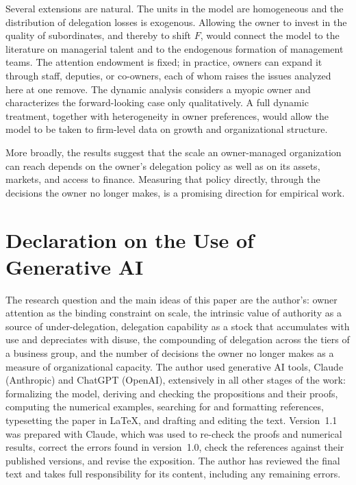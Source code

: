\documentclass[11pt,a4paper]{article}
\theoremstyle{plain}
\begin{document}
Several extensions are natural. The units in the model are homogeneous and the distribution of delegation losses is exogenous. Allowing the owner to invest in the quality of subordinates, and thereby to shift $F$, would connect the model to the literature on managerial talent and to the endogenous formation of management teams. The attention endowment is fixed; in practice, owners can expand it through staff, deputies, or co-owners, each of whom raises the issues analyzed here at one remove. The dynamic analysis considers a myopic owner and characterizes the forward-looking case only qualitatively. A full dynamic treatment, together with heterogeneity in owner preferences, would allow the model to be taken to firm-level data on growth and organizational structure.

More broadly, the results suggest that the scale an owner-managed organization can reach depends on the owner's delegation policy as well as on its assets, markets, and access to finance. Measuring that policy directly, through the decisions the owner no longer makes, is a promising direction for empirical work.

\section*{Declaration on the Use of Generative AI}\label{sec:ai}

The research question and the main ideas of this paper are the author's: owner attention as the binding constraint on scale, the intrinsic value of authority as a source of under-delegation, delegation capability as a stock that accumulates with use and depreciates with disuse, the compounding of delegation across the tiers of a business group, and the number of decisions the owner no longer makes as a measure of organizational capacity. The author used generative AI tools, Claude (Anthropic) and ChatGPT (OpenAI), extensively in all other stages of the work: formalizing the model, deriving and checking the propositions and their proofs, computing the numerical examples, searching for and formatting references, typesetting the paper in \LaTeX, and drafting and editing the text. Version~1.1 was prepared with Claude, which was used to re-check the proofs and numerical results, correct the errors found in version~1.0, check the references against their published versions, and revise the exposition. The author has reviewed the final text and takes full responsibility for its content, including any remaining errors.
\end{document}
